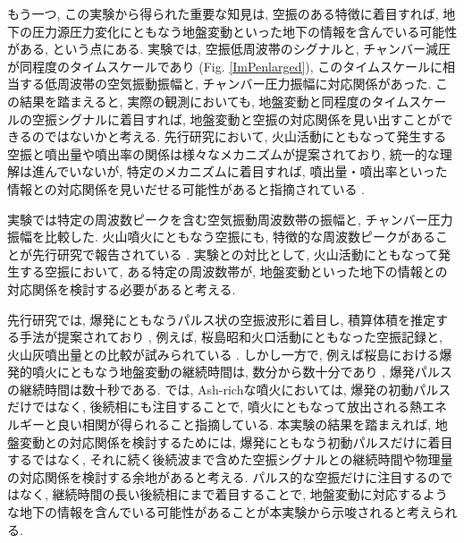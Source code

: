 \documentclass[12pt]{article}
\begin{document}
もう一つ, この実験から得られた重要な知見は, 空振のある特徴に着目すれば, 地下の圧力源圧力変化にともなう地盤変動といった地下の情報を含んでいる可能性がある, という点にある.
実験では, 空振低周波帯のシグナルと, チャンバー減圧が同程度のタイムスケールであり (Fig. \ref{ImPenlarged}), このタイムスケールに相当する低周波帯の空気振動振幅と, チャンバー圧力振幅に対応関係があった. この結果を踏まえると, 実際の観測においても, 地盤変動と同程度のタイムスケールの空振シグナルに着目すれば, 地盤変動と空振の対応関係を見い出すことができるのではないかと考える.
先行研究において, 火山活動にともなって発生する空振と噴出量や噴出率の関係は様々なメカニズムが提案されており, 統一的な理解は進んでいないが, 特定のメカニズムに着目すれば, 噴出量・噴出率といった情報との対応関係を見いだせる可能性があると指摘されている \citep{Ichihara2016a}.

実験では特定の周波数ピークを含む空気振動周波数帯の振幅と, チャンバー圧力振幅を比較した. 火山噴火にともなう空振にも, 特徴的な周波数ピークがあることが先行研究で報告されている \citep{yokoo2012bo}. 実験との対比として, 火山活動にともなって発生する空振において, ある特定の周波数帯が, 地盤変動といった地下の情報との対応関係を検討する必要があると考える.

先行研究では, 爆発にともなうパルス状の空振波形に着目し, 積算体積を推定する手法が提案されており \citep{Johnson2003}, 例えば, 桜島昭和火口活動にともなった空振記録と, 火山灰噴出量との比較が試みられている \citep{Fee2017a}. しかし一方で, 例えば桜島における爆発的噴火にともなう地盤変動の継続時間は, 数分から数十分であり \citep{Iguchi2012, Iguchi2013a}, 爆発パルスの継続時間は数十秒である.
\cite{DelleDonne2016} では, Ash-richな噴火においては, 爆発の初動パルスだけではなく, 後続相にも注目することで, 噴火にともなって放出される熱エネルギーと良い相関が得られること指摘している. 本実験の結果を踏まえれば, 地盤変動との対応関係を検討するためには, 爆発にともなう初動パルスだけに着目するではなく, それに続く後続波まで含めた空振シグナルとの継続時間や物理量の対応関係を検討する余地があると考える. パルス的な空振だけに注目するのではなく, 継続時間の長い後続相にまで着目することで, 地盤変動に対応するような地下の情報を含んでいる可能性があることが本実験から示唆されると考えられる.



\clearpage \newpage

 
\end{document}
